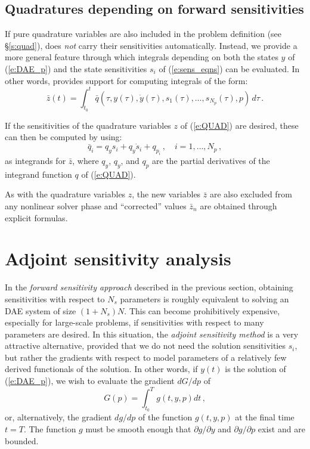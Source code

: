 \subsection{Quadratures depending on forward sensitivities}
If pure quadrature variables are also included in the problem definition
(see \S\ref{s:quad}), {\idas} does {\em not} carry their sensitivities 
automatically. Instead, we provide a more general feature through which
integrals depending on both the states $y$ of (\ref{e:DAE_p}) and the
state sensitivities $s_i$ of (\ref{e:sens_eqns}) can be evaluated. In other
words, {\idas} provides support for computing integrals of the form:
\begin{equation*}
 \bar z(t) = \int_{t_0}^t \bar q(\tau, y(\tau), \dot{y}(\tau), s_1(\tau), \ldots,
              s_{N_p}(\tau),p) \, d\tau \, .
\end{equation*}

If the sensitivities of the quadrature variables $z$ of (\ref{e:QUAD}) are
desired, these can then be computed by using:
\begin{equation*}
  \bar q_i = q_y s_i + q_{\dot{y}} \dot{s}_i + q_{p_i} \, , \quad i = 1,\ldots,N_p \, ,
\end{equation*}
as integrands for $\bar z$, where $q_y$, $q_{\dot{y}}$, and $q_p$ are the partial
derivatives of the integrand function $q$ of (\ref{e:QUAD}).

As with the quadrature variables $z$, the new variables $\bar z$ are also excluded
from any nonlinear solver phase and ``corrected'' values $\bar z_n$ are obtained
through explicit formulas. 


\section{Adjoint sensitivity analysis}\label{ss:adj_sensi}
In the {\em forward sensitivity approach} described in the previous
section, obtaining sensitivities with respect to $N_s$ parameters is roughly
equivalent to solving an DAE system of size $(1+N_s) N$. This can become 
prohibitively expensive, especially for large-scale problems, if sensitivities
with respect to many parameters are desired.
In this situation, the {\em adjoint sensitivity method} is a very
attractive alternative, provided that we do not need the solution sensitivities
$s_i$, but rather the gradients with respect to model parameters of a relatively 
few derived functionals of the solution. In other words, if $y(t)$ is the solution
of (\ref{e:DAE_p}), we wish to evaluate the gradient ${dG}/{dp}$ of
\begin{equation}\label{e:G}
G(p) = \int_{t_0}^T g(t, y, p) dt \, ,
\end{equation}
or, alternatively, the gradient ${dg}/{dp}$ of the function $g(t, y, p)$ 
at the final time $t = T$. 
The function $g$ must be smooth enough that $\partial g / \partial y$ 
and $\partial g / \partial p$ exist and are bounded. 

